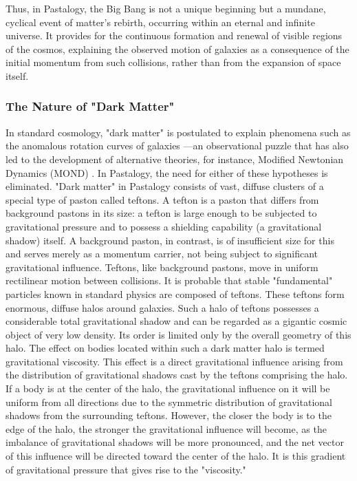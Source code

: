 \documentclass[pdflatex,sn-mathphys-num]{sn-jnl}
\begin{document}
Thus, in Pastalogy, the Big Bang is not a unique beginning but a mundane, cyclical event of matter's rebirth, occurring within an eternal and infinite universe. It provides for the continuous formation and renewal of visible regions of the cosmos, explaining the observed motion of galaxies as a consequence of the initial momentum from such collisions, rather than from the expansion of space itself.

\subsubsection{The Nature of "Dark Matter"}\label{subsubsec:dark-matter}

In standard cosmology, "dark matter" is postulated to explain phenomena such as the anomalous rotation curves of galaxies \cite{rubin1980}---an observational puzzle that has also led to the development of alternative theories, for instance, Modified Newtonian Dynamics (MOND) \cite{milgrom1983-mond}. In Pastalogy, the need for either of these hypotheses is eliminated.
"Dark matter" in Pastalogy consists of vast, diffuse clusters of a special type of paston called teftons. A tefton is a paston that differs from background pastons in its size: a tefton is large enough to be subjected to gravitational pressure and to possess a shielding capability (a gravitational shadow) itself. A background paston, in contrast, is of insufficient size for this and serves merely as a momentum carrier, not being subject to significant gravitational influence. Teftons, like background pastons, move in uniform rectilinear motion between collisions. It is probable that stable "fundamental" particles known in standard physics are composed of teftons.
These teftons form enormous, diffuse halos around galaxies. Such a halo of teftons possesses a considerable total gravitational shadow and can be regarded as a gigantic cosmic object of very low density. Its order is limited only by the overall geometry of this halo.
The effect on bodies located within such a dark matter halo is termed gravitational viscosity. This effect is a direct gravitational influence arising from the distribution of gravitational shadows cast by the teftons comprising the halo. If a body is at the center of the halo, the gravitational influence on it will be uniform from all directions due to the symmetric distribution of gravitational shadows from the surrounding teftons. However, the closer the body is to the edge of the halo, the stronger the gravitational influence will become, as the imbalance of gravitational shadows will be more pronounced, and the net vector of this influence will be directed toward the center of the halo. It is this gradient of gravitational pressure that gives rise to the "viscosity."
\end{document}
